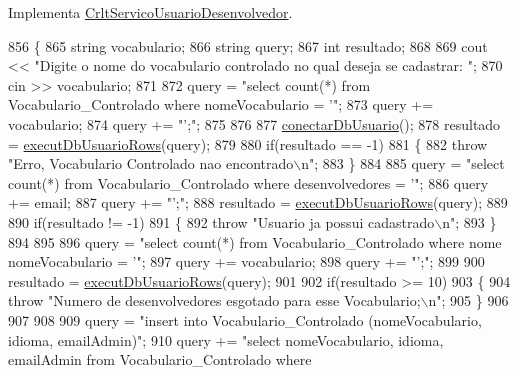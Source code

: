 Implementa \mbox{\hyperlink{class_crlt_servico_usuario_desenvolvedor_a8eb6d3af46ac497a394882ef0fe32eb1}{Crlt\+Servico\+Usuario\+Desenvolvedor}}.


\begin{DoxyCode}
856 \{
865   \textcolor{keywordtype}{string} vocabulario;
866   \textcolor{keywordtype}{string} query;
867   \textcolor{keywordtype}{int} resultado;
868 
869       cout << \textcolor{stringliteral}{"Digite o nome do vocabulario controlado no qual deseja se cadastrar: "};
870       cin >> vocabulario;
871 
872       query = \textcolor{stringliteral}{"select count(*) from Vocabulario\_Controlado where nomeVocabulario = '"};
873       query += vocabulario;
874       query += \textcolor{stringliteral}{"';"};
875 
876 
877       \mbox{\hyperlink{comando_sql_8cpp_a4f89ddcbc4cf8f2587d89f72f8c7900d}{conectarDbUsuario}}();
878       resultado = \mbox{\hyperlink{comando_sql_8cpp_af54952694f2fa7d76f969fb74b853cb9}{executDbUsuarioRows}}(query);
879 
880       \textcolor{keywordflow}{if}(resultado == -1)
881       \{
882         \textcolor{keywordflow}{throw} \textcolor{stringliteral}{"Erro, Vocabulario Controlado nao encontrado\(\backslash\)n"};
883       \}
884 
885         query = \textcolor{stringliteral}{"select count(*) from Vocabulario\_Controlado where desenvolvedores = '"};
886         query += email;
887         query += \textcolor{stringliteral}{"';"};
888         resultado = \mbox{\hyperlink{comando_sql_8cpp_af54952694f2fa7d76f969fb74b853cb9}{executDbUsuarioRows}}(query);
889 
890         \textcolor{keywordflow}{if}(resultado != -1)
891         \{
892           \textcolor{keywordflow}{throw} \textcolor{stringliteral}{"Usuario ja possui cadastrado\(\backslash\)n"};
893         \}
894 
895 
896         query = \textcolor{stringliteral}{"select count(*) from Vocabulario\_Controlado where nome nomeVocabulario = '"};
897         query += vocabulario;
898         query += \textcolor{stringliteral}{"';"};
899 
900         resultado = \mbox{\hyperlink{comando_sql_8cpp_af54952694f2fa7d76f969fb74b853cb9}{executDbUsuarioRows}}(query);
901 
902         \textcolor{keywordflow}{if}(resultado >= 10)
903         \{
904           \textcolor{keywordflow}{throw} \textcolor{stringliteral}{"Numero de desenvolvedores esgotado para esse Vocabulario;\(\backslash\)n"};
905         \}
906 
907 
908 
909         query = \textcolor{stringliteral}{"insert into Vocabulario\_Controlado (nomeVocabulario, idioma, emailAdmin)"};
910         query += \textcolor{stringliteral}{"select nomeVocabulario, idioma, emailAdmin from Vocabulario\_Controlado where
}
\end{DoxyCode}
